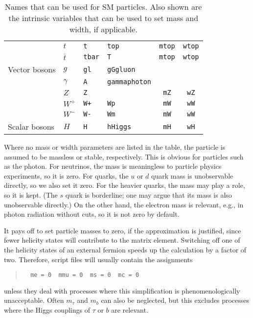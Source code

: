 \documentclass[12pt]{book}
\newcommand{\ttt}[1]{\texttt{#1}}
\begin{document}
\begin{table}[p]
\begin{center}
\begin{tabular}{|l|l|l|l|cc|}
      \hline
      &$t$ & \verb|t| & \ttt{top} &  \ttt{mtop} & \ttt{wtop} \\
      &$\bar t$ & \verb|tbar| & \ttt{T} &  \ttt{mtop} & \ttt{wtop} \\
      \hline\hline
      Vector bosons
      &$g$ & \verb|gl| & \ttt{g}\quad\ttt{G}\quad\ttt{gluon} & & \\
      \hline
      &$\gamma$ & \verb|A| & \ttt{gamma}\quad\ttt{photon} & & \\
      \hline
      &$Z$ & \verb|Z| & & \ttt{mZ} & \ttt{wZ} \\
      \hline
      &$W^+$ & \verb|W+| & \ttt{Wp} & \ttt{mW} & \ttt{wW} \\
      &$W^-$ & \verb|W-| & \ttt{Wm} & \ttt{mW} & \ttt{wW} \\
      \hline\hline
      Scalar bosons
      &$H$ & \verb|H| & \ttt{h}\quad \ttt{Higgs} & \ttt{mH} & \ttt{wH} \\
      \hline
    \end{tabular}
  \end{center}
  \caption{\label{tab:SM-particles} Names that can be used for SM particles.
    Also shown are the intrinsic variables that can be used to set mass and
    width, if applicable.}
\end{table}

Where no mass or width parameters are listed in the table, the particle is
assumed to be massless or stable, respectively.  This is obvious for particles
such as the photon.  For neutrinos, the mass is meaningless to particle
physics experiments, so it is zero.  For quarks, the $u$ or $d$ quark mass is
unobservable directly, so we also set it zero.  For the heavier quarks, the
mass may play a role, so it is kept.  (The $s$ quark is borderline; one may
argue that its mass is also unobservable directly.)  On the other hand, the
electron mass is relevant, e.g., in photon radiation without cuts, so it is
not zero by default.

It pays off to set particle masses to zero, if the approximation is justified,
since fewer helicity states will contribute to the matrix element.  Switching
off one of the helicity states of an external fermion speeds up the
calculation by a factor of two.  Therefore, script files will usually contain
the assignments
\begin{quote}
\begin{footnotesize}
\begin{verbatim}
  me = 0  mmu = 0  ms = 0  mc = 0
\end{verbatim}
\end{footnotesize}
\end{quote}
unless they deal with processes where this simplification is
phenomenologically unacceptable.  Often $m_\tau$ and $m_b$ can also be
neglected, but this excludes processes where the Higgs couplings of $\tau$ or
$b$ are relevant.  
\end{document}
